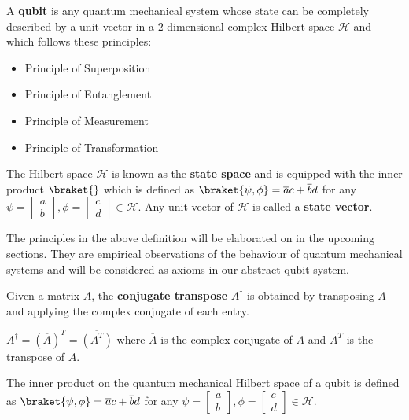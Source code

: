 \begin{samepage}
\begin{defn}
    A \textbf{qubit} is any quantum mechanical system whose state can be completely described by a unit vector in a $2$-dimensional complex Hilbert space $\mathcal{H}$ and which follows these principles: 
\begin{itemize}
    \item Principle of Superposition
    \item Principle of Entanglement
    \item Principle of Measurement
    \item Principle of Transformation
\end{itemize}
    The Hilbert space $\mathcal{H}$ is known as the \textbf{state space} and is equipped with the inner product $\braket{}$ which is defined as $\braket{\psi, \phi} = \overline{a} c + \overline{b} d$ for any $\psi = \begin{bmatrix} a\\b\end{bmatrix}, \phi = \begin{bmatrix} c \\ d \end{bmatrix} \in \mathcal{H}$. Any unit vector of $\mathcal{H}$ is called a \textbf{state vector}.
\end{defn}

The principles in the above definition will be elaborated on in the upcoming sections.
They are empirical observations of the behaviour of quantum mechanical systems and will be considered as axioms in our abstract qubit system.
\end{samepage}

\begin{defn}
    Given a matrix $A$, the \textbf{conjugate transpose} $A^\dagger$ is obtained by transposing $A$ and applying the complex conjugate of each entry.

    $A^\dagger = (\overline{A})^T = \overline{(A^T)}$ where $\overline{A}$ is the complex conjugate of $A$ and $A^T$ is the transpose of $A$.
\end{defn}

\begin{defn}
    The inner product on the quantum mechanical Hilbert space of a qubit is defined as $\braket{\psi, \phi} = \overline{a} c + \overline{b} d$ for any  $\psi = \begin{bmatrix} a\\b\end{bmatrix}, \phi = \begin{bmatrix} c \\ d \end{bmatrix} \in \mathcal{H}$. 
\end{defn}

